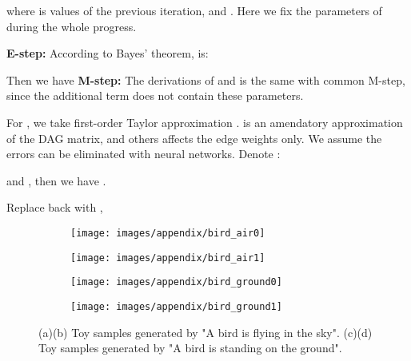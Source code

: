 \documentclass[letterpaper]{article} \usepackage{aaai23}  \usepackage{times}  \usepackage{helvet}  \usepackage{courier}  \usepackage[hyphens]{url}  \usepackage{graphicx} \urlstyle{rm} \def\UrlFont{\rm}  \usepackage{natbib}  \usepackage{caption} \frenchspacing  \setlength{\pdfpagewidth}{8.5in}  \setlength{\pdfpageheight}{11in}  \usepackage{algorithm}
\theoremstyle{plain}
\theoremstyle{definition}
\theoremstyle{remark}
\begin{document}
where  is values of the previous iteration,  and . Here we fix the parameters of  during the whole progress.  





\textbf{E-step:} According to Bayes' theorem,  is:



Then we have 
\textbf{M-step:}
The derivations of  and  is the same with common M-step, since the additional term does not contain these parameters. 




For , we take first-order Taylor approximation .  is an amendatory approximation of the DAG matrix, and others affects the edge weights only. We assume the errors can be eliminated with neural networks. Denote :
  
and , then we have .

Replace  back with ,
 



\begin{figure*}
	\centering
	\begin{subfigure}[t]{.22\textwidth}
		\centering
		\texttt{[image: images/appendix/bird\_air0]}
		\caption{}
		\label{fig:app_toy_1}
	\end{subfigure}
	\hfill
	\begin{subfigure}[t]{.22\textwidth}
		\centering
		\texttt{[image: images/appendix/bird\_air1]}
		\caption{}
		\label{fig:app_toy_2}
	\end{subfigure}		
	\hfill		
	\begin{subfigure}[t]{.22 \textwidth}
		\centering
		\texttt{[image: images/appendix/bird\_ground0]}
		\caption{}
		\label{fig:app_toy_3}
	\end{subfigure}
	\hfill
	\begin{subfigure}[t]{.22\textwidth}
		\centering
		\texttt{[image: images/appendix/bird\_ground1]}
		\caption{}
		\label{fig:app_toy_4}
	\end{subfigure}
	
	\caption{(a)(b) Toy samples generated by "A bird is flying in the sky". (c)(d) Toy samples generated by "A bird is standing on the ground".  }  
	\label{fig:app_toy_11}
\end{figure*}
\end{document}
